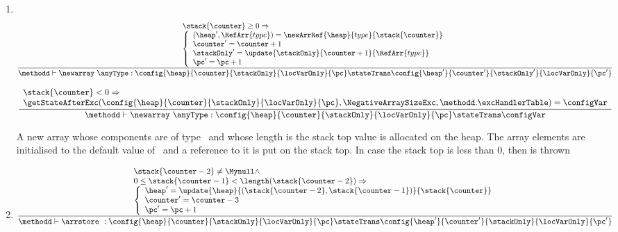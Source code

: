 \begin{itemize}
\begin{enumerate}
        \item  \newarray  \ \anyType \\
	        $$ \frac{\begin{array}{l}
		               \stack{\counter} \geq 0 \Rightarrow \\
			       \left\{\begin{array}{l}
			                    (\heap',\RefArr{type} ) = \newArrRef{\heap}{type}{\stack{\counter}}\\
					    \counter' = \counter + 1\\
					    \stackOnly' = \update{\stackOnly}{\counter +  1}{\RefArr{type}} \\
					    \pc' = \pc + 1
			               \end{array}\right.
			       \end{array}  }
                {\methodd \vdash  \newarray \ \anyType :  \config{\heap}{\counter}{\stackOnly}{\locVarOnly}{\pc} 
		               \stateTrans  
			       \config{\heap'}
			              {\counter'}
				      {\stackOnly' }
				      {\locVarOnly}
				      {\pc'}  }  $$

	  
	        $$ \frac{\begin{array}{l}
		               \stack{\counter} < 0 \Rightarrow \\
			       \getStateAfterExc( \config{\heap}{\counter}{\stackOnly}{\locVarOnly}{\pc}, \NegativeArraySizeExc,\methodd.\excHandlerTable ) =  \configVar                	        \end{array}  }
                {\methodd \vdash  \newarray \ \anyType :  \config{\heap}{\counter}{\stackOnly}{\locVarOnly}{\pc} 
			                      \stateTrans  
					      \configVar }  $$
	  
	A new array whose components are of type \anyType \ and whose length is the stack top value is allocated on the heap.
	The array elements are initialised to the default value of  \anyType \ and a reference to it is put on the stack top. 
	In case the stack top is less than 0, then \NegativeArraySizeExc is thrown 

     
        \item \arrstore


      
	 $$ \frac{ \begin{array}{l} 
	             \stack{\counter - 2} \neq \Mynull \wedge \\
		     0 \leq \stack{\counter - 1  } < \length( \stack{\counter - 2} ) \Rightarrow \\
		     \left\{\begin{array}{l}
		                    \heap' = \update{\heap}{( \stack{\counter - 2},\stack{\counter - 1} ) }{ \stack{\counter}} \\
			            \counter' = \counter - 3 \\
				    \pc'  =  \pc + 1
		     \end{array}\right.
		\end{array}}
		{\methodd \vdash  \arrstore \ :  \config{\heap}{\counter}{\stackOnly}{\locVarOnly}{\pc} 
						 \stateTrans  
						 \config{\heap'}{\counter'}{\stackOnly}{\locVarOnly}{\pc'}} $$



\end{enumerate}
\end{itemize}
